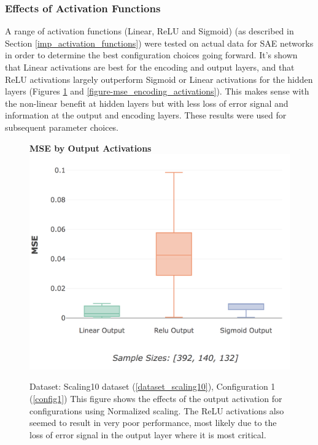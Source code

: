 \documentclass[a4paper,11pt,oneside]{article}
\theoremstyle{plain}
\theoremstyle{definition}
\begin{document}
	
	
	\subsubsection{Effects of Activation Functions}\label{results_activations_scaling}
	
	A range of activation functions (Linear, ReLU and Sigmoid) (as described in Section \ref{imp_activation_functions}) were tested on actual data for SAE networks in order to determine the best configuration choices going forward. It's shown that Linear activations are best for the encoding and output layers, and that ReLU activations largely outperform Sigmoid or Linear activations for the hidden layers (Figures \ref{figure-actual_mse_output} and \ref{figure-mse_encoding_activations}). This makes sense with the non-linear benefit at hidden layers but with less loss of error signal and information at the output and encoding layers. These results were used for subsequent parameter choices.
	
	\begin{figure}[H]
		\centering
		\textbf{MSE by Output Activations}
		\includegraphics[scale=0.4]{images/results/activations/actual_mse_output.png}
		\caption[MSE by Output Activations]
		{Dataset: Scaling10 dataset (\ref{dataset_scaling10}), Configuration 1 (\ref{config1})
		\newline This figure shows the effects of the output activation for configurations using Normalized scaling. The ReLU activations also seemed to result in very poor performance, most likely due to the loss of error signal in the output layer where it is most critical. }
		\label{figure-actual_mse_output}
	\end{figure}%
	
\end{document}
